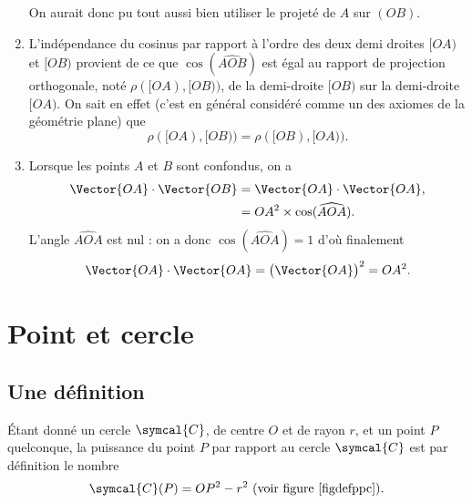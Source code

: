 \begin{remark}
\begin{example}[Remarques]
\begin{enumerate}
On aurait donc pu tout aussi bien utiliser le projeté de $A$ sur $(OB)$. 
\item L'indépendance du cosinus par rapport à l'ordre des deux demi droites $[OA)$ et $[OB)$ provient de ce que $\cos(\widehat{AOB})$ est égal au rapport de projection orthogonale, noté $\rho([OA),[OB))$, de  la demi-droite $[OB)$ sur la demi-droite $[OA)$. On sait en effet (c'est en général considéré comme un des axiomes de la géométrie plane) que
\[\rho([OA),[OB))=\rho([OB),[OA)).\]

 \item Lorsque les points $A$ et $B$ sont confondus, on a 
 \begin{align*}
 \Vector{OA}\cdot\Vector{OB}&=\Vector{OA}\cdot\Vector{OA},\\
 &=OA^2\times \cos(\widehat{AOA}).
 \end{align*}
 L'angle $\widehat{AOA}$ est nul : on a donc $\cos(\widehat{AOA})=1$ d'où finalement 
 \begin{equation}
\Vector{OA}\cdot\Vector{OA}=\bigl({\Vector{OA}}\bigr)^2=OA^2.\label{eqcarres}
\end{equation}
\end{enumerate}
\end{example}
\end{remark}

\section{Point et cercle}
\subsection{Une définition}
Étant donné un cercle $\symcal{C}$, de centre $O$ et de rayon $r$, et un point $P$ quelconque, la puissance du point $P$ par rapport au cercle $\symcal{C}$ est par définition le nombre 
\[\symcal{C}(P)=OP^2-r^2 \text{ (voir figure~\ref{figdefppc})}.\]

\begin{figure}[ht]
\centering
{}
\figcaption{}\label{figdefppc}
\end{figure}

